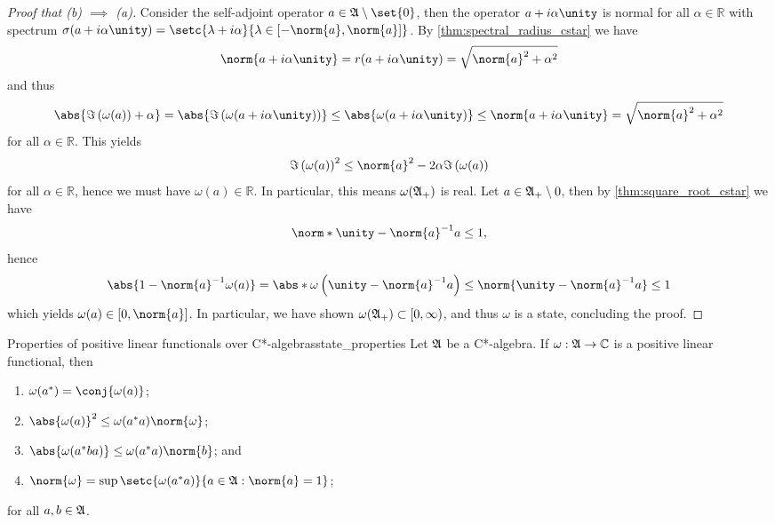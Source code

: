 \begin{proof}[Proof that (b) \(\implies\) (a)]
    Consider the self-adjoint operator \(a \in \algebra{A} \setminus \set{0}\), then the operator \(a + i\alpha \unity\) is normal for all \(\alpha \in \mathbb{R}\) with spectrum \(\sigma(a + i \alpha \unity) = \setc{\lambda + i \alpha}{\lambda \in [-\norm{a}, \norm{a}]}\). By \cref{thm:spectral_radius_cstar} we have
    \begin{equation*}
        \norm{a + i \alpha \unity} = r(a + i \alpha \unity) = \sqrt{\norm{a}^2 + \alpha^2}
    \end{equation*}
    and thus
    \begin{equation*}
        \abs{\Im\left(\omega(a)\right) + \alpha} = \abs{\Im\left(\omega(a + i \alpha \unity)\right)} \leq \abs{\omega(a + i \alpha \unity)} \leq \norm{a + i \alpha \unity} = \sqrt{\norm{a}^2 + \alpha^2}
    \end{equation*}
    for all \(\alpha \in \mathbb{R}\). This yields
    \begin{equation*}
        \Im\left(\omega(a)\right)^2 \leq \norm{a}^2 - 2 \alpha \Im\left(\omega(a)\right)
    \end{equation*}
    for all \(\alpha \in \mathbb{R}\), hence we must have \(\omega(a) \in \mathbb{R}\). In particular, this means \(\omega(\mathfrak{A}_+)\) is real. Let \(a \in \mathfrak{A}_+\setminus{0}\), then by \cref{thm:square_root_cstar} we have
    \begin{equation*}
        \norm*{\unity - \norm{a}^{-1}a} \leq 1,
    \end{equation*}
    hence
    \begin{equation*}
        \abs{1 - \norm{a}^{-1} \omega(a)} = \abs*{\omega\left(\unity - \norm{a}^{-1}a\right)} \leq \norm{\unity - \norm{a}^{-1}a} \leq 1
    \end{equation*}
    which yields \(\omega(a) \in [0, \norm{a}]\). In particular, we have shown \(\omega(\mathfrak{A}_+) \subset [0, \infty)\), and thus \(\omega\) is a state, concluding the proof.
\end{proof}
\begin{proposition}{Properties of positive linear functionals over C*-algebras}{state_properties}
    Let \(\mathfrak{A}\) be a C*-algebra. If \(\omega : \mathfrak{A} \to \mathbb{C}\) is a positive linear functional, then
    \begin{enumerate}[label=(\alph*)]
        \item \(\omega(a^*) = \conj{\omega(a)}\);
        \item \(\abs{\omega(a)}^2 \leq \omega(a^*a)\norm{\omega}\);
        \item \(\abs{\omega(a^*ba)} \leq \omega(a^*a) \norm{b}\); and
        \item \(\norm{\omega} = \sup\setc{\omega(a^*a)}{a \in \algebra{A} : \norm{a} = 1}\);
    \end{enumerate}
    for all \(a, b \in \mathfrak{A}\).
\end{proposition}
